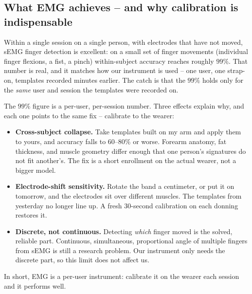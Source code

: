 \subsection{What EMG achieves -- and why calibration is indispensable}
\label{ch37:emg-perf}

Within a single session on a single person, with electrodes that have not moved,
sEMG finger detection is excellent: on a small set of finger movements (individual
finger flexions, a fist, a pinch) within-subject accuracy reaches roughly $99\%$.
That number is real, and it matches how our instrument is used -- one user,
one strap-on, templates recorded minutes earlier. The catch is that the $99\%$ holds
only for the \emph{same} user and session the templates were recorded on.

\begin{trapbox}
The $99\%$ figure is a per-user, per-session number. Three effects explain why, and
each one points to the same fix -- calibrate to the wearer:
\begin{itemize}
\item \textbf{Cross-subject collapse.} Take templates built on my arm and apply them
to yours, and accuracy falls to $60$--$80\%$ or worse. Forearm anatomy, fat thickness,
and muscle geometry differ enough that one person's signatures do not fit another's.
The fix is a short enrollment on the actual wearer, not a bigger model.
\item \textbf{Electrode-shift sensitivity.} Rotate the band a centimeter, or put it on
tomorrow, and the electrodes sit over different muscles. The templates from yesterday
no longer line up. A fresh $30$-second calibration on each donning restores it.
\item \textbf{Discrete, not continuous.} Detecting \emph{which} finger moved is the
solved, reliable part. Continuous, simultaneous, proportional angle of multiple
fingers from sEMG is still a research problem. Our instrument only needs the discrete
part, so this limit does not affect us.
\end{itemize}
In short, EMG is a per-user instrument: calibrate it on the wearer each session
and it performs well.
\end{trapbox}


